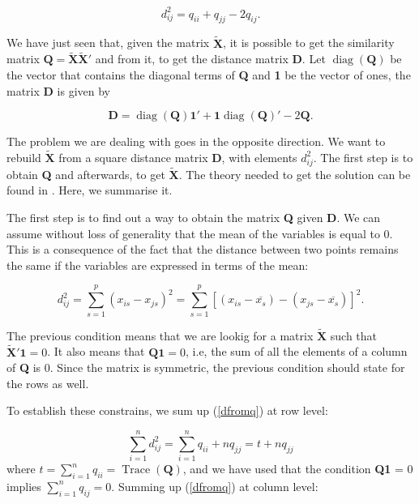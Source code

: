 \documentclass[11pt]{report}
\DeclareMathOperator{\Tr}{Trace}
\DeclareMathOperator{\diag}{diag}
\begin{document}
\begin{equation} \label{dfromq}
d^2_{ij} = q_{ii} + q_{jj} - 2q_{ij}.
\end{equation}

\indent We have just seen that, given the matrix $\mathbf{\widetilde{X}}$, 
it is possible to get the similarity matrix 
$\mathbf{Q} = \mathbf{\widetilde{X}}\mathbf{\widetilde{X}'}$ and from it, 
to get the distance matrix \textbf{D}. Let $\diag(\mathbf{Q})$ be the
vector that contains the diagonal terms of \textbf{Q} and \textbf{1} be the vector
of ones, the matrix \textbf{D} is given by

\[
\mathbf{D} = \diag(\mathbf{Q}) \mathbf{1}' + \mathbf{1}\diag(\mathbf{Q})' - 2\mathbf{Q}.
\]

\indent The problem we are dealing with goes in the opposite direction. We want 
to rebuild $\mathbf{\widetilde{X}}$ from a square distance matrix \textbf{D}, 
with elements $d_{ij}^2$. The first step is to obtain \textbf{Q} and afterwards, 
to get $\mathbf{\widetilde{X}}$. The theory needed to get the solution can be 
found in \cite{pena_libro}. Here, we summarise it.

\indent The first step is to find out a way to obtain the matrix \textbf{Q} 
given \textbf{D}. We can assume without loss of generality that the mean of 
the variables is equal to 0. This is a consequence of the fact that the distance 
between two points remains the same if the variables are expressed in terms 
of the mean:


\begin{equation} \label{dtraslated}
d_{ij}^2 = \sum_{s = 1}^p (x_{is} - x_{js})^2 = \sum_{s=1} ^p [(x_{is} - \overline{x_s})- (x_{js} - \overline{x_s})]^2.
\end{equation}

\indent The previous condition means that we are lookig for a matrix  
$\mathbf{\widetilde{X}}$ such that $\mathbf{\widetilde{X}'}\mathbf{1} = 0$. 
It also means that $\mathbf{Q}\mathbf{1} = 0$, i.e, the sum of all the elements 
of a column of \textbf{Q} is 0. Since the matrix is symmetric, the previous 
condition should state for the rows as well. 

\indent To establish these constrains, we sum up (\ref{dfromq}) at row level:

\begin{equation} \label{sumrows}
\sum_{i = 1}^n d_{ij}^2 = \sum_{i = 1}^n q_{ii} + nq_{jj} = t + nq_{jj}
\end{equation}
where $t = \sum_{i = 1}^n q_{ii} = \Tr(\mathbf{Q})$, and we have used that the
condition \textbf{Q}\textbf{1} = 0 implies $\sum_{i = 1}^n q_{ij} = 0$. Summing 
up (\ref{dfromq}) at column level:
\end{document}

